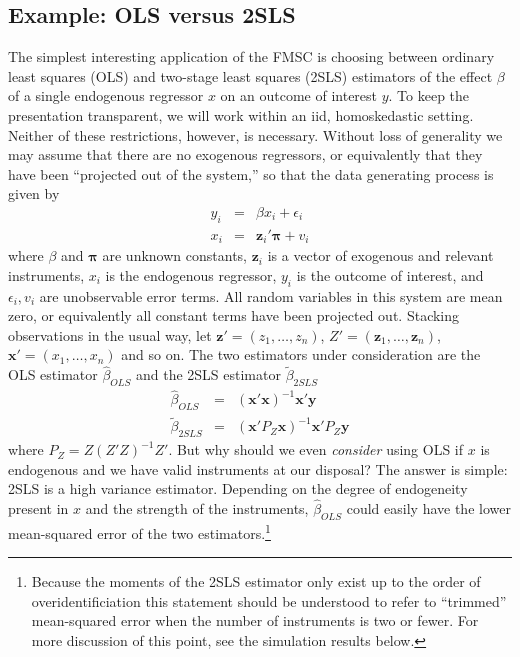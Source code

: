 \subsection{Example: OLS versus 2SLS}
\label{sec:OLSvsIVlowlevel}
The simplest interesting application of the FMSC is choosing between ordinary least squares (OLS) and two-stage least squares (2SLS) estimators of the effect $\beta$ of a single endogenous regressor $x$ on an outcome of interest $y$. 
To keep the presentation transparent, we will work within an iid, homoskedastic setting. 
Neither of these restrictions, however, is necessary. 
Without loss of generality we may assume that there are no exogenous regressors, or equivalently that they have been ``projected out of the system,'' so that the data generating process is given by
    \begin{eqnarray}
			y_{i} &=& \beta x_{i}  + \epsilon_{i}\\
	x_{i} &=& \mathbf{z}_{i}' \boldsymbol{\pi} + v_{i}
	\end{eqnarray}
where $\beta$ and $\boldsymbol{\pi}$ are unknown constants, $\mathbf{z}_i$ is a vector of exogenous and relevant instruments, $x_i$ is the endogenous regressor, $y_i$ is the outcome of interest, and $\epsilon_i, v_i$ are unobservable error terms. 
All random variables in this system are mean zero, or equivalently all constant terms have been projected out. 
Stacking observations in the usual way, let 
$\mathbf{z}' = (z_{1}, \hdots, z_{n})$, $Z' = (\mathbf{z}_{1}, \hdots, \mathbf{z}_{n})$, $\mathbf{x}' = (x_{1}, \hdots, x_{n})$ and so on. The two estimators under consideration are the OLS estimator $\widehat{\beta}_{OLS}$ and the 2SLS estimator $\widetilde{\beta}_{2SLS}$
  \begin{eqnarray} 
  \label{eq:OLS}
		\widehat{\beta}_{OLS} &=& \left(\mathbf{x}'\mathbf{x}\right)^{-1}\mathbf{x}'\mathbf{y}\\
	\label{eq:2SLS}
		\widetilde{\beta}_{2SLS} &=& \left(\mathbf{x}'P_Z\mathbf{x}\right)^{-1}\mathbf{x}'P_Z\mathbf{y}
	\end{eqnarray}
where $P_Z = Z(Z'Z)^{-1}Z'$. 
But why should we even \emph{consider} using OLS if $x$ is endogenous and we have valid instruments at our disposal? 
The answer is simple: 2SLS is a high variance estimator. 
Depending on the degree of endogeneity present in $x$ and the strength of the instruments, $\widehat{\beta}_{OLS}$ could easily have the lower mean-squared error of the two estimators.\footnote{Because the moments of the 2SLS estimator only exist up to the order of overidentificiation \citep{Phillips1980} this statement should be understood to refer to ``trimmed'' mean-squared error when the number of instruments is two or fewer. For more discussion of this point, see the simulation results below.} 
